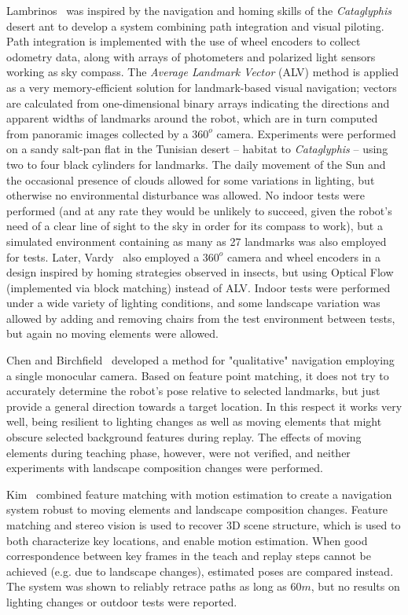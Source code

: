 \documentclass[twocolumn, 9pt,fleqn]{jsproceedings}
\begin{document}
Lambrinos~\cite{LAM00} was inspired by the navigation and homing skills of the \textit{Cataglyphis} desert ant to develop a system combining path integration and visual piloting. Path integration is implemented with the use of wheel encoders to collect odometry data, along with arrays of photometers and polarized light sensors working as sky compass. The \textit{Average Landmark Vector} (ALV) method is applied as a very memory-efficient solution for landmark-based visual navigation; vectors are calculated from one-dimensional binary arrays indicating the directions and apparent widths of landmarks around the robot, which are in turn computed from panoramic images collected by a $360^o$ camera. Experiments were performed on a sandy salt-pan flat in the Tunisian desert -- habitat to \textit{Cataglyphis} -- using two to four black cylinders for landmarks. The daily movement of the Sun and the occasional presence of clouds allowed for some variations in lighting, but otherwise no environmental disturbance was allowed. No indoor tests were performed (and at any rate they would be unlikely to succeed, given the robot's need of a clear line of sight to the sky in order for its compass to work), but a simulated environment containing as many as 27 landmarks was also employed for tests. Later, Vardy~\cite{VAR05} also employed a $360^o$ camera and wheel encoders in a design inspired by homing strategies observed in insects, but using Optical Flow (implemented via block matching) instead of ALV. Indoor tests were performed under a wide variety of lighting conditions, and some landscape variation was allowed by adding and removing chairs from the test environment between tests, but again no moving elements were allowed.

Chen and Birchfield~\cite{CHE06} developed a method for "qualitative" navigation employing a single monocular camera. Based on feature point matching, it does not try to accurately determine the robot's pose relative to selected landmarks, but just provide a general direction towards a target location. In this respect it works very well, being resilient to lighting changes as well as moving elements that might obscure selected background features during replay. The effects of moving elements during teaching phase, however, were not verified, and neither experiments with landscape composition changes were performed.

Kim~\cite{KIM08} combined feature matching with motion estimation to create a navigation system robust to moving elements and landscape composition changes. Feature matching and stereo vision is used to recover 3D scene structure, which is used to both characterize key locations, and enable motion estimation. When good correspondence between key frames in the teach and replay steps cannot be achieved (e.g. due to landscape changes), estimated poses are compared instead. The system was shown to reliably retrace paths as long as $60m$, but no results on lighting changes or outdoor tests were reported.
\end{document}

